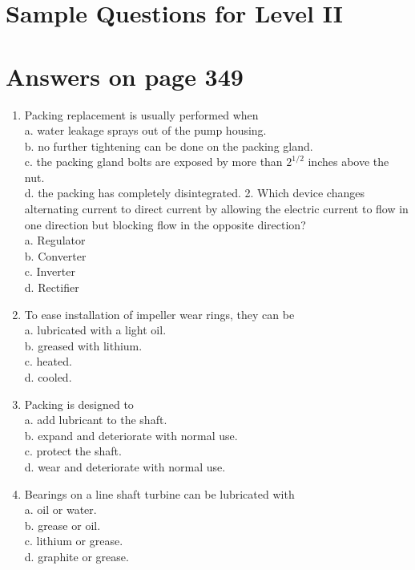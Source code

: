 \documentclass[10pt]{article}
\begin{document}
\section{Sample Questions for Level II}
\section{Answers on page 349}
\begin{enumerate}
  \item Packing replacement is usually performed when\\
a. water leakage sprays out of the pump housing.\\
b. no further tightening can be done on the packing gland.\\
c. the packing gland bolts are exposed by more than $2^{1 / 2}$ inches above the nut.\\
d. the packing has completely disintegrated. 2. Which device changes alternating current to direct current by allowing the electric current to flow in one direction but blocking flow in the opposite direction?\\
a. Regulator\\
b. Converter\\
c. Inverter\\
d. Rectifier

  \item To ease installation of impeller wear rings, they can be\\
a. lubricated with a light oil.\\
b. greased with lithium.\\
c. heated.\\
d. cooled.

  \item Packing is designed to\\
a. add lubricant to the shaft.\\
b. expand and deteriorate with normal use.\\
c. protect the shaft.\\
d. wear and deteriorate with normal use.

  \item Bearings on a line shaft turbine can be lubricated with\\
a. oil or water.\\
b. grease or oil.\\
c. lithium or grease.\\
d. graphite or grease.

\end{enumerate}
\end{document}
